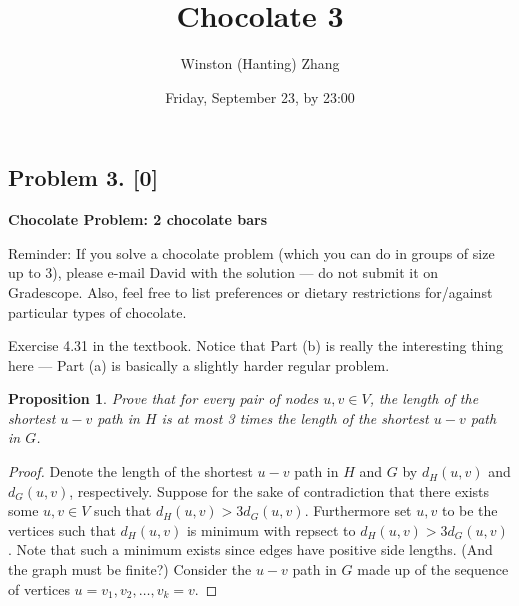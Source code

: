 \documentclass[10pt]{article}
\title{\bf Chocolate 3}
\author{Winston (Hanting) Zhang}
\date{Friday, September 23, by 23:00}
\newtheorem{proposition}[lemma]{Proposition}
\begin{document}
\maketitle

\subsection*{Problem 3. [0]}
\textbf{Chocolate Problem: 2 chocolate bars}

Reminder: If you solve a chocolate problem (which you can do in groups of size up to 3), please e-mail David with the solution --- do not submit it on Gradescope. Also, feel free to list preferences or dietary restrictions for/against particular types of chocolate.

Exercise 4.31 in the textbook. Notice that Part (b) is really the interesting thing here --- Part (a) is basically a slightly harder regular problem.

\begin{proposition}
  Prove that for every pair of nodes \(u, v \in V\), the length of the shortest \(u-v\) path in \(H\) is at most 3 times the length of the shortest \(u-v\) path in \(G\). 
\end{proposition}

\begin{proof}
  Denote the length of the shortest \(u-v\) path in \(H\) and \(G\) by \(d_H(u, v)\) and \(d_G(u, v)\), respectively. Suppose for the sake of contradiction that there exists some \(u, v \in V\) such that \(d_H(u, v) > 3 d_G(u, v)\). Furthermore set \(u, v\) to be the vertices such that \(d_H(u, v)\) is minimum with repsect to \(d_H(u, v) > 3 d_G(u, v)\). Note that such a minimum exists since edges have positive side lengths. (And the graph must be finite?) Consider the \(u-v\) path in \(G\) made up of the sequence of vertices \(u = v_1, v_2, \dots, v_k = v\). 
\end{proof}
\end{document}
